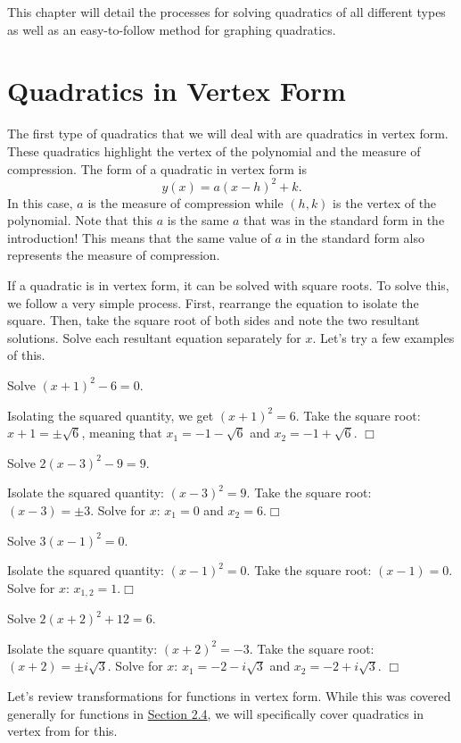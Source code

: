 \documentclass[lang=en,11pt]{elegantbook}
\begin{document}
This chapter will detail the processes for solving quadratics of all different types as well as an easy-to-follow method for graphing quadratics.
\section{Quadratics in Vertex Form}
\noindent The first type of quadratics that we will deal with are quadratics in vertex form.  These quadratics highlight the vertex of the polynomial and the measure of compression.  The form of a quadratic in vertex form is $$y(x)=a(x-h)^2+k.$$  In this case, $a$ is the measure of compression while $(h,k)$ is the vertex of the polynomial.  Note that this $a$ is the same $a$ that was in the standard form in the introduction!  This means that the same value of $a$ in the standard form also represents the measure of compression.

If a quadratic is in vertex form, it can be solved with square roots.  To solve this, we follow a very simple process.  First, rearrange the equation to isolate the square.  Then, take the square root of both sides and note the two resultant solutions.  Solve each resultant equation separately for $x$.  Let's try a few examples of this.
\begin{example}
Solve $(x+1)^2-6=0$.
\end{example}
\begin{solution}
Isolating the squared quantity, we get $(x+1)^2=6$.  Take the square root: $x+1=\pm\sqrt{6}$, meaning that $x_1=-1-\sqrt{6}$ and $x_2=-1+\sqrt{6}$.  $\Box$
\end{solution}
\begin{example}
Solve $2(x-3)^2-9=9$.
\end{example}
\begin{solution}
Isolate the squared quantity: $(x-3)^2=9$.  Take the square root: $(x-3)=\pm 3$.  Solve for $x$: $x_1=0$ and $x_2=6$.$\Box$
\end{solution}
\begin{example}
Solve $3(x-1)^2=0$.
\end{example}
\begin{solution}
Isolate the squared quantity: $(x-1)^2=0$.  Take the square root: $(x-1)=0$.  Solve for $x$: $x_{1,2}=1$.$\Box$
\end{solution}
\begin{example}
Solve $2(x+2)^2+12=6$.
\end{example}
\begin{solution}
Isolate the square quantity: $(x+2)^2=-3$.  Take the square root: $(x+2)=\pm i\sqrt{3}$.  Solve for $x$: $x_1=-2-i\sqrt{3}$ and $x_2=-2+i\sqrt{3}$.  $\Box$
\end{solution}
Let's review transformations for functions in vertex form.  While this was covered generally for functions in \hyperlink{section.2.4}{Section 2.4}, we will specifically cover quadratics in vertex from for this.
\end{document}

